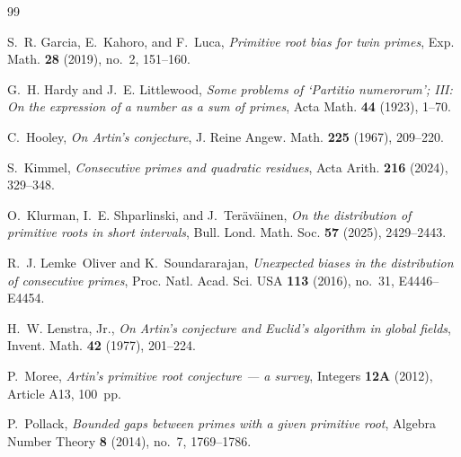 \documentclass[11pt,reqno]{amsart}
\theoremstyle{plain}
\theoremstyle{definition}
\begin{document}
\begin{thebibliography}{99}

S.~R. Garcia, E.~Kahoro, and F.~Luca,
\emph{Primitive root bias for twin primes},
Exp. Math. \textbf{28} (2019), no.~2, 151--160.

G.~H. Hardy and J.~E. Littlewood,
\emph{Some problems of `Partitio numerorum'; III: On the expression of a
number as a sum of primes},
Acta Math. \textbf{44} (1923), 1--70.

C.~Hooley,
\emph{On Artin's conjecture},
J. Reine Angew. Math. \textbf{225} (1967), 209--220.

S.~Kimmel,
\emph{Consecutive primes and quadratic residues},
Acta Arith. \textbf{216} (2024), 329--348.

O.~Klurman, I.~E. Shparlinski, and J.~Ter\"av\"ainen,
\emph{On the distribution of primitive roots in short intervals},
Bull. Lond. Math. Soc. \textbf{57} (2025), 2429--2443.

R.~J. Lemke~Oliver and K.~Soundararajan,
\emph{Unexpected biases in the distribution of consecutive primes},
Proc. Natl. Acad. Sci. USA \textbf{113} (2016), no.~31, E4446--E4454.

H.~W. Lenstra, Jr.,
\emph{On Artin's conjecture and Euclid's algorithm in global fields},
Invent. Math. \textbf{42} (1977), 201--224.

P.~Moree,
\emph{Artin's primitive root conjecture --- a survey},
Integers \textbf{12A} (2012), Article A13, 100~pp.

P.~Pollack,
\emph{Bounded gaps between primes with a given primitive root},
Algebra Number Theory \textbf{8} (2014), no.~7, 1769--1786.

\end{thebibliography}
\end{document}
